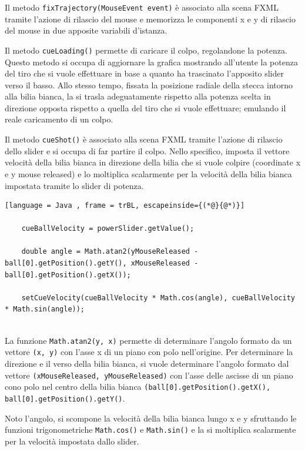 \documentclass[12pt,a4paper]{report}
\begin{document}
Il metodo \texttt{fixTrajectory(MouseEvent event)} è associato alla scena FXML tramite l'azione di rilascio del mouse e memorizza le componenti x e y di rilascio del mouse in due apposite variabili d'istanza.

Il metodo \texttt{cueLoading()} permette di caricare il colpo, regolandone la potenza.
Questo metodo si occupa di aggiornare la grafica mostrando all'utente la potenza del tiro che si vuole effettuare in base a quanto ha trascinato l'apposito slider verso il basso.
Allo stesso tempo, fissata la posizione radiale della stecca intorno alla bilia bianca, la si trasla adeguatamente rispetto alla potenza scelta in direzione opposta rispetto a quella del tiro che si vuole effettuare; emulando il reale caricamento di un colpo.

Il metodo \texttt{cueShot()} è associato alla scena FXML tramite l'azione di rilascio dello slider e si occupa di far partire il colpo.
Nello specifico, imposta il vettore velocità della bilia bianca in direzione della bilia che si vuole colpire (coordinate x e y mouse released) e lo moltiplica scalarmente per la velocità della bilia bianca impostata tramite lo slider di potenza.

\vspace{5mm}

\begin{lstlisting}[language = Java , frame = trBL, escapeinside={(*@}{@*)}]

	cueBallVelocity = powerSlider.getValue();
	
    double angle = Math.atan2(yMouseReleased - ball[0].getPosition().getY(), xMouseReleased - ball[0].getPosition().getX());
    
	setCueVelocity(cueBallVelocity * Math.cos(angle), cueBallVelocity * Math.sin(angle));
	
\end{lstlisting}

\vspace{5mm}

La funzione \texttt{Math.atan2(y, x)} permette di determinare l'angolo formato da un vettore \texttt{(x, y)} con l'asse x di un piano con polo nell'origine.
Per determinare la direzione e il verso della bilia bianca, si vuole determinare l'angolo formato dal vettore \texttt{(xMouseReleased, yMouseReleased)} con l'asse delle ascisse di un piano cono polo nel centro della bilia bianca \texttt{(ball[0].getPosition().getX(), ball[0].getPosition().getY()}.

Noto l'angolo, si scompone la velocità della bilia bianca lungo x e y sfruttando le funzioni trigonometriche \texttt{Math.cos()} e \texttt{Math.sin()} e la si moltiplica scalarmente per la velocità impostata dallo slider.
\end{document}

